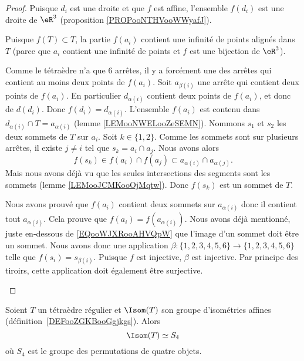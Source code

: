 \begin{proof}
	Puisque \( d_i\) est une droite et que \( f\) est affine, l'ensemble \( f(d_i)\) est une droite de \( \eR^3\) (proposition \ref{PROPooNTHVooWWyafJ}).

	\begin{subproof}
		Puisque \( f(T)\subset T\), la partie \( f(a_i)\) contient une infinité de points alignés dans \( T\) (parce que \( a_i\) contient une infinité de points et \( f\) est une bijection de \( \eR^3\)).

		Comme le tétraèdre n'a que \( 6\) arrêtes, il y a forcément une des arrêtes qui contient au moins deux points de \( f(a_i)\). Soit \( a_{\beta(i)}\) une arrête qui contient deux points de \( f(a_i)\). En particulier \( d_{\alpha(i)}\) contient deux points de \( f(a_i)\), et donc de \( d(d_i)\). Donc \( f(d_i)=d_{\alpha(i)}\).
		L'ensemble \( f(a_i)\) est contenu dans \( d_{\alpha(i)}\cap T=a_{\alpha(i)}\) (lemme \ref{LEMooNWELooZeSEMN}). Nommons \( s_1\) et \( s_2\) les deux sommets de \( T\) sur \( a_i\). Soit \( k\in\{ 1,2 \}\). Comme les sommets sont sur plusieurs arrêtes, il existe \( j\neq i\) tel que \( s_k=a_i\cap a_j\). Nous avons alors
		\begin{equation}        \label{EQooWJXRooAHVQpW}
			f(s_k)\in f(a_i)\cap f(a_j)\subset a_{\alpha(i)}\cap a_{\alpha(j)}.
		\end{equation}
		Mais nous avons déjà vu que les seules intersections des segments sont les sommets (lemme \ref{LEMooJCMKooOjMqtw}). Donc \( f(s_k)\) est un sommet de \( T\).

		Nous avons prouvé que \( f(a_i)\) contient deux sommets sur \( a_{\alpha(i)}\) donc il contient tout \( a_{\alpha(i)}\). Cela prouve que \( f(a_i)=f(a_{\alpha(i)})\).
		Nous avons déjà mentionné, juste en-dessous de \eqref{EQooWJXRooAHVQpW} que l'image d'un sommet doit être un sommet. Nous avons donc une application \( \beta\colon \{ 1,2,3,4,5,6 \}\to \{ 1,2,3,4,5,6 \}\) telle que \( f(s_i)=s_{\beta(i)}\). Puisque \( f\) est injective, \( \beta\) est injective. Par principe des tiroirs, cette application doit également être surjective.
	\end{subproof}
\end{proof}

\begin{proposition}       \label{PROPooVNLKooOjQzCj}
	Soient \( T\) un tétraèdre régulier et \( \Isom(T)\) son groupe d'isométries affines (définition~\ref{DEFooZGKBooGgjkgs}). Alors
	\begin{equation}
		\Isom(T)\simeq S_4
	\end{equation}
	où \( S_4\) est le groupe des permutations de quatre objets.
\end{proposition}

